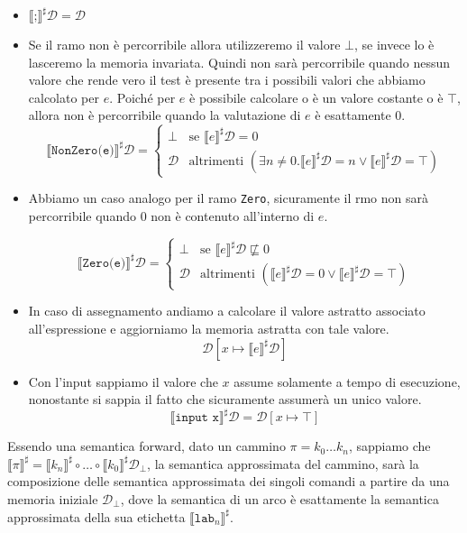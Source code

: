 \begin{itemize}
    \item $\llbracket \texttt{;} \rrbracket^\sharp \mathcal{D} = \mathcal{D}$
    \item Se il ramo non è percorribile allora utilizzeremo il valore $\bot$, 
    se invece lo è lasceremo la memoria invariata.
    Quindi non sarà percorribile quando nessun valore che rende vero il test è 
    presente tra i possibili valori che abbiamo calcolato per $e$. Poiché per $e$  
    è possibile calcolare o è un valore costante o è $\top$, allora non è percorribile
    quando la valutazione di $e$ è esattamente $0$.
    \[
        \llbracket \texttt{NonZero(e)} \rrbracket^\sharp \mathcal{D} = 
        \begin{cases}
            \bot & \text{se } \llbracket e \rrbracket^\sharp \mathcal{D} = 0 \\
            \mathcal{D} & \text{altrimenti } (\exists n \not = 0 . 
            \llbracket e \rrbracket^\sharp \mathcal{D} = n \lor
            \llbracket e \rrbracket^\sharp \mathcal{D} = \top)
        \end{cases}  
    \]
    \item Abbiamo un caso analogo per il ramo \texttt{Zero}, sicuramente il rmo non sarà percorribile 
    quando $0$ non è contenuto all'interno di $e$.
    
    \[
      \llbracket \texttt{Zero(e)} \rrbracket^\sharp \mathcal{D} =
        \begin{cases}
            \bot & \text{se } \llbracket e \rrbracket^\sharp \mathcal{D} \not\sqsubseteq 0 \\
            \mathcal{D} & \text{altrimenti } (\llbracket e \rrbracket^\sharp \mathcal{D}
            = 0 \lor \llbracket e \rrbracket^\sharp \mathcal{D} = \top)
        \end{cases}  
    \]
    \item In caso di assegnamento andiamo a calcolare il valore astratto associato all'espressione 
    e aggiorniamo la memoria astratta con tale valore.
    \[
      \mathcal{D}[x \mapsto \llbracket e \rrbracket^\sharp \mathcal{D}]
    \]
    \item Con l'input sappiamo il valore che $x$ assume solamente a tempo di esecuzione, nonostante 
    si sappia il fatto che sicuramente assumerà un unico valore.
    \[
      \llbracket \texttt{input x} \rrbracket^\sharp \mathcal{D} = \mathcal{D}[x \mapsto \top]  
    \]
\end{itemize}
Essendo una semantica forward, dato un cammino $\pi = k_0 \dots k_n$, sappiamo che
$\llbracket \pi \rrbracket^\sharp = \llbracket k_n \rrbracket^\sharp \circ \dots \circ
\llbracket k_0 \rrbracket^\sharp \mathcal{D}_\bot$, la semantica approssimata del cammino, 
sarà la composizione delle semantica approssimata dei singoli comandi a partire da una 
memoria iniziale $\mathcal{D}_\bot$, dove la semantica di un arco è esattamente 
la semantica approssimata della sua etichetta $\llbracket \texttt{lab}_n \rrbracket^\sharp$.

